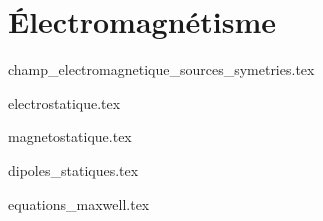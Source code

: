\part{Électromagnétisme}

{champ_electromagnetique_sources_symetries.tex}

{electrostatique.tex}

{magnetostatique.tex}

{dipoles_statiques.tex}

{equations_maxwell.tex}